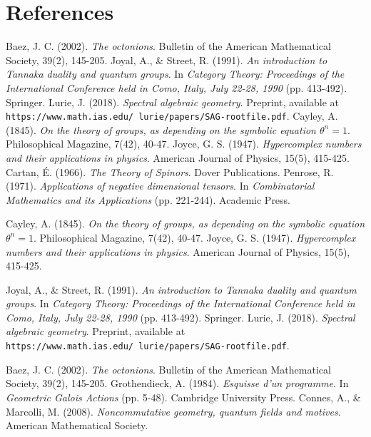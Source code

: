 \documentclass{article}
\begin{document}
\section*{References}
\begin{thebibliography}{9}


 Baez, J. C. (2002). \textit{The octonions}. Bulletin of the American Mathematical Society, 39(2), 145-205.
 Joyal, A., \& Street, R. (1991). \textit{An introduction to Tannaka duality and quantum groups}. In \textit{Category Theory: Proceedings of the International Conference held in Como, Italy, July 22-28, 1990} (pp. 413-492). Springer.
 Lurie, J. (2018). \textit{Spectral algebraic geometry}. Preprint, available at \texttt{https://www.math.ias.edu/~lurie/papers/SAG-rootfile.pdf}.
 Cayley, A. (1845). \textit{On the theory of groups, as depending on the symbolic equation \(\theta^n = 1\)}. Philosophical Magazine, 7(42), 40-47.
 Joyce, G. S. (1947). \textit{Hypercomplex numbers and their applications in physics}. American Journal of Physics, 15(5), 415-425.
 Cartan, É. (1966). \textit{The Theory of Spinors}. Dover Publications.
 Penrose, R. (1971). \textit{Applications of negative dimensional tensors}. In \textit{Combinatorial Mathematics and its Applications} (pp. 221-244). Academic Press.

 Cayley, A. (1845). \textit{On the theory of groups, as depending on the symbolic equation \(\theta^n = 1\)}. Philosophical Magazine, 7(42), 40-47.
 Joyce, G. S. (1947). \textit{Hypercomplex numbers and their applications in physics}. American Journal of Physics, 15(5), 415-425.

 Joyal, A., \& Street, R. (1991). \textit{An introduction to Tannaka duality and quantum groups}. In \textit{Category Theory: Proceedings of the International Conference held in Como, Italy, July 22-28, 1990} (pp. 413-492). Springer.
 Lurie, J. (2018). \textit{Spectral algebraic geometry}. Preprint, available at \texttt{https://www.math.ias.edu/~lurie/papers/SAG-rootfile.pdf}.

 Baez, J. C. (2002). \textit{The octonions}. Bulletin of the American Mathematical Society, 39(2), 145-205.
 Grothendieck, A. (1984). \textit{Esquisse d’un programme}. In \textit{Geometric Galois Actions} (pp. 5-48). Cambridge University Press.
 Connes, A., \& Marcolli, M. (2008). \textit{Noncommutative geometry, quantum fields and motives}. American Mathematical Society.


\end{thebibliography}
\end{document}
